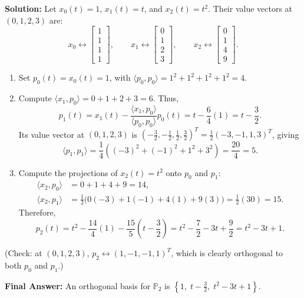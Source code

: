 \documentclass[11pt, letterpaper]{article}
\theoremstyle{definition}
\theoremstyle{remark}
\begin{document}
\textbf{Solution:} Let $x_0(t) = 1$, $x_1(t) = t$, and $x_2(t) = t^2$. Their value vectors at $(0, 1, 2, 3)$ are:
\[
x_0 \leftrightarrow \begin{bmatrix} 1 \\ 1 \\ 1 \\ 1 \end{bmatrix}, \qquad
x_1 \leftrightarrow \begin{bmatrix} 0 \\ 1 \\ 2 \\ 3 \end{bmatrix}, \qquad
x_2 \leftrightarrow \begin{bmatrix} 0 \\ 1 \\ 4 \\ 9 \end{bmatrix}.
\]
\begin{enumerate}
    \item Set $p_0(t) = x_0(t) = 1$, with $\langle p_0, p_0 \rangle = 1^2 + 1^2 + 1^2 + 1^2 = 4$.
    \item Compute $\langle x_1, p_0 \rangle = 0 + 1 + 2 + 3 = 6$. Thus,
    \[
    p_1(t) = x_1(t) - \frac{\langle x_1, p_0 \rangle}{\langle p_0, p_0 \rangle}p_0(t) = t - \frac{6}{4}(1) = t - \frac{3}{2}.
    \]
    Its value vector at $(0, 1, 2, 3)$ is $\left(-\frac{3}{2}, -\frac{1}{2}, \frac{1}{2}, \frac{3}{2}\right)^T = \frac{1}{2}(-3, -1, 1, 3)^T$, giving
    \[
    \langle p_1, p_1 \rangle = \frac{1}{4}\left((-3)^2 + (-1)^2 + 1^2 + 3^2\right) = \frac{20}{4} = 5.
    \]
    \item Compute the projections of $x_2(t) = t^2$ onto $p_0$ and $p_1$:
    \begin{align*}
    \langle x_2, p_0 \rangle &= 0 + 1 + 4 + 9 = 14, \\
    \langle x_2, p_1 \rangle &= \frac{1}{2}\big(0(-3) + 1(-1) + 4(1) + 9(3)\big) = \frac{1}{2}(30) = 15.
    \end{align*}
    Therefore,
    \[
    p_2(t) = t^2 - \frac{14}{4}(1) - \frac{15}{5}\left(t - \frac{3}{2}\right) = t^2 - \frac{7}{2} - 3t + \frac{9}{2} = t^2 - 3t + 1.
    \]
\end{enumerate}
(Check: at $(0, 1, 2, 3)$, $p_2 \leftrightarrow (1, -1, -1, 1)^T$, which is clearly orthogonal to both $p_0$ and $p_1$.)

\textbf{Final Answer:} An orthogonal basis for $\mathbb{P}_2$ is $\left\{1,\; t - \frac{3}{2},\; t^2 - 3t + 1\right\}$.
\end{document}
